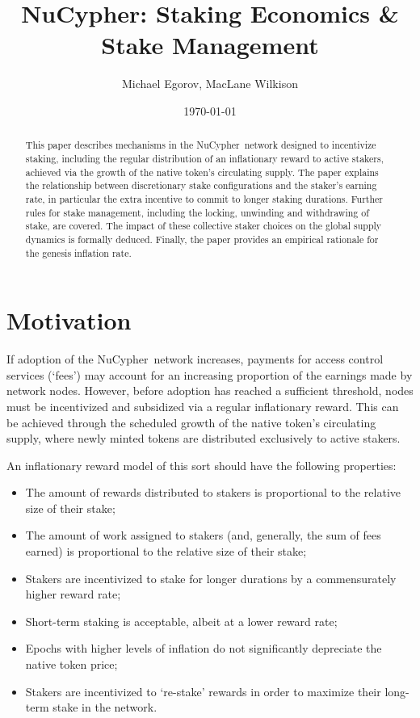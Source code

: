 \documentclass[longbibliography,nofootinbib,twocolumn]{revtex4-1}
\newcommand{\nucypher}{NuCypher}
\begin{document}
\title{\nucypher: Staking Economics \& Stake Management}

\author{Michael Egorov, MacLane Wilkison}

\begin{abstract}
This paper describes mechanisms in the \nucypher~network designed to incentivize staking, including the regular distribution of an inflationary reward to active stakers, achieved via the growth of the native token's circulating supply. The paper explains the relationship between discretionary stake configurations and the staker's earning rate, in particular the extra incentive to commit to longer staking durations. Further rules for stake management, including the locking, unwinding and withdrawing of stake, are covered. The impact of these collective staker choices on the global supply dynamics is formally deduced. Finally, the paper provides an empirical rationale for the genesis inflation rate. 

\end{abstract}

\date{\today}
\maketitle

\section{Motivation}

If adoption of the \nucypher~network increases, payments for access control services (`fees') may account for an increasing proportion of the earnings made by network nodes. However, before adoption has reached a sufficient threshold, nodes must be incentivized and subsidized via a regular inflationary reward.
This can be achieved through the scheduled growth of the native token's circulating supply, where newly minted tokens are distributed exclusively to active stakers.

An inflationary reward model of this sort should have the following properties:
\begin{itemize}
    \item The amount of rewards distributed to stakers is proportional to the relative size of their stake;
    \item The amount of work assigned to stakers (and, generally, the sum of fees earned) is proportional to the relative size of their stake;
    \item Stakers are incentivized to stake for longer durations by a commensurately higher reward rate;
    \item Short-term staking is acceptable, albeit at a lower reward rate;
    \item Epochs with higher levels of inflation do not significantly depreciate the native token price;
    \item Stakers are incentivized to `re-stake' rewards in order to maximize their long-term stake in the network.
\end{itemize}
\end{document}
